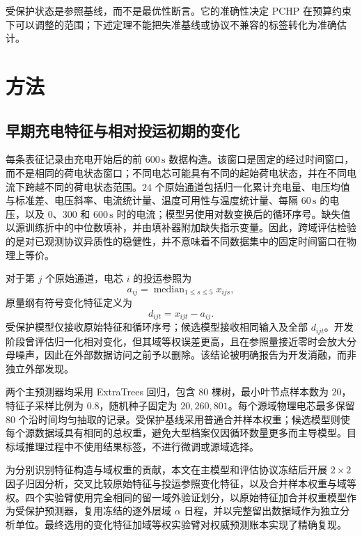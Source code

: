 \documentclass[UTF8,11pt]{ctexart}
\begin{document}
受保护状态是参照基线，而不是最优性断言。它的准确性决定 PCHP 在预算约束下可以调整的范围；下述定理不能把失准基线或协议不兼容的标签转化为准确估计。

\section{方法}

\subsection{早期充电特征与相对投运初期的变化}

每条表征记录由充电开始后的前 $600\,\mathrm{s}$ 数据构造。该窗口是固定的经过时间窗口，而不是相同的荷电状态窗口；不同电芯可能具有不同的起始荷电状态，并在不同电流下跨越不同的荷电状态范围。$24$ 个原始通道包括归一化累计充电量、电压均值与标准差、电压斜率、电流统计量、温度可用性与温度统计量、每隔 $60\,\mathrm{s}$ 的电压，以及 $0$、$300$ 和 $600\,\mathrm{s}$ 时的电流；模型另使用对数变换后的循环序号。缺失值以源训练折中的中位数填补，并由填补器附加缺失指示变量。因此，跨域评估检验的是对已观测协议异质性的稳健性，并不意味着不同数据集中的固定时间窗口在物理上等价。

对于第 $j$ 个原始通道，电芯 $i$ 的投运参照为
\begin{equation}
  a_{ij}=\operatorname{median}_{1\leq s\leq5}x_{ijs},
\end{equation}
原量纲有符号变化特征定义为
\begin{equation}
  d_{ijt}=x_{ijt}-a_{ij}.
  \label{eq:change_zh}
\end{equation}
受保护模型仅接收原始特征和循环序号；候选模型接收相同输入及全部 $d_{ijt}$。开发阶段曾评估归一化相对变化，但其域等权误差更高，且在参照量接近零时会放大分母噪声，因此在外部数据访问之前予以删除。该结论被明确报告为开发消融，而非独立外部发现。

两个主预测器均采用 ExtraTrees 回归，包含 $80$ 棵树，最小叶节点样本数为 $20$，特征子采样比例为 $0.8$，随机种子固定为 $20{,}260{,}801$。每个源域物理电芯最多保留 $80$ 个沿时间均匀抽取的记录。受保护基线采用普通合并样本权重；候选模型则使每个源数据域具有相同的总权重，避免大型档案仅因循环数量更多而主导模型。目标域推理过程中不使用结果标签，不进行微调或源域选择。

为分别识别特征构造与域权重的贡献，本文在主模型和评估协议冻结后开展 $2\times2$ 因子归因分析，交叉比较原始特征与投运参照变化特征，以及合并样本权重与域等权。四个实验臂使用完全相同的留一域外验证划分，以原始特征加合并权重模型作为受保护预测器，复用冻结的逐外层域 $\alpha$ 日程，并以完整留出数据域作为独立分析单位。最终选用的变化特征加域等权实验臂对权威预测账本实现了精确复现。
\end{document}
